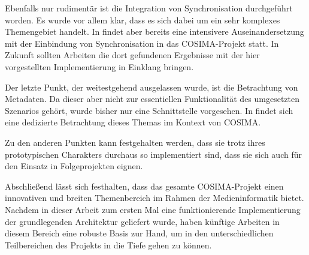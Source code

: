   Ebenfalls nur rudimentär ist die Integration von Synchronisation durchgeführt worden. Es wurde vor allem klar, dass es sich dabei um ein sehr komplexes Themengebiet handelt. In \citep{antons09} findet aber bereits eine intensivere Auseinandersetzung mit der Einbindung von Synchronisation in das COSIMA-Projekt statt. In Zukunft sollten Arbeiten die dort gefundenen Ergebnisse mit der hier vorgestellten Implementierung in Einklang bringen.
  
  Der letzte Punkt, der weitestgehend ausgelassen wurde, ist die Betrachtung von Metadaten. Da dieser aber nicht zur essentiellen Funktionalität des umgesetzten Szenarios gehört, wurde bisher nur eine Schnittstelle vorgesehen. In \citep{lehmann09} findet sich eine dedizierte Betrachtung dieses Themas im Kontext von COSIMA.
  
  Zu den anderen Punkten kann festgehalten werden, dass sie trotz ihres prototypischen Charakters durchaus so implementiert sind, dass sie sich auch für den Einsatz in Folgeprojekten eignen.
  
  Abschließend lässt sich festhalten, dass das gesamte COSIMA-Projekt einen innovativen und breiten Themenbereich im Rahmen der Medieninformatik bietet. Nachdem in dieser Arbeit zum ersten Mal eine funktionierende Implementierung der grundlegenden Architektur geliefert wurde, haben künftige Arbeiten in diesem Bereich eine robuste Basis zur Hand, um in den unterschiedlichen Teilbereichen des Projekts in die Tiefe gehen zu können.

